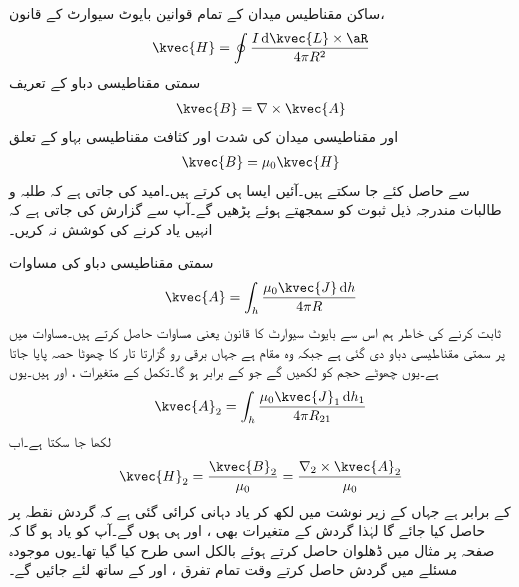 ساکن مقناطیس میدان کے تمام قوانین بایوٹ سیوارٹ کے قانون،
\begin{align}\label{مساوات_مقناطیسی_بایوٹ_سیوارٹ_قانون_بطور_ثبوت}
\kvec{H}=\oint \frac{I \dif \kvec{L} \times \aR}{4\pi R^2}
\end{align}
سمتی مقناطیسی دباو کے تعریف
\begin{align}\label{مساوات-مقناطیسی_سمتی_مقناطیسی_دباو_تعریف_دوبارہ}
\kvec{B}=\nabla \times \kvec{A}
\end{align}
اور مقناطیسی میدان کی شدت اور کثافت مقناطیسی  بہاو کے تعلق
\begin{align}\label{مساوات_مقناطیسی_شدت_اور_کثافت_بہاو_کا_تعلق}
\kvec{B}=\mu_0 \kvec{H}
\end{align}
سے حاصل کئے جا سکتے ہیں۔آئیں ایسا ہی کرتے  ہیں۔امید کی جاتی ہے کہ طلبہ و طالبات مندرجہ ذیل ثبوت کو سمجھتے ہوئے پڑھیں گے۔آپ سے گزارش کی جاتی ہے کہ انہیں یاد کرنے کی کوشش نہ کریں۔

سمتی مقناطیسی دباو  کی مساوات
\begin{align}\label{مساوات_مقناطیسی_سمتی_مقناطیسی_دباو_حجمی_رو_ب}
\kvec{A}=\int_h \frac{\mu_0 \kvec{J} \dif h}{4\pi R}
\end{align}
ثابت کرنے کی خاطر ہم اس سے بایوٹ سیوارٹ کا قانون یعنی مساوات   حاصل کرتے ہیں۔مساوات  میں  پر سمتی مقناطیسی دباو دی گئی ہے جبکہ  وہ مقام ہے جہاں برقی رو گزارتا تار کا چھوٹا حصہ پایا جاتا ہے۔یوں چھوٹے حجم کو  لکھیں گے جو  کے برابر ہو گا۔تکمل کے متغیرات ،  اور  ہیں۔یوں
\begin{align}\label{مساوات_مقناطیسی_سمتی_مقناطیسی_دباو_دوسرا_نقطہ}
\kvec{A}_2=\int_h \frac{\mu_0 \kvec{J}_1 \dif h_1}{4\pi R_{21}}
\end{align}
لکھا جا سکتا ہے۔اب 
\begin{align*}
\kvec{H}_2=\frac{\kvec{B}_2}{\mu_0}=\frac{\nabla_2 \times \kvec{A}_2}{\mu_0}
\end{align*}
کے برابر ہے جہاں  کے زیر نوشت میں  لکھ کر یاد دہانی کرائی گئی ہے کہ گردش نقطہ  پر حاصل کیا جائے گا لہٰذا گردش کے متغیرات بھی ،  اور  ہی ہوں گے۔آپ کو یاد ہو گا کہ صفحہ  پر مثال  میں ڈھلوان حاصل کرتے ہوئے بالکل اسی طرح کیا گیا تھا۔یوں موجودہ مسئلے میں گردش حاصل کرتے وقت تمام تفرق ،  اور  کے ساتھ لئے جائیں گے۔

